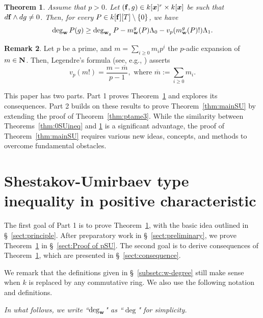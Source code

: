 \documentclass{amsart}
\theoremstyle{plain}
\newtheorem{thm}{Theorem}[section]
\theoremstyle{definition}
\newtheorem{rem}[thm]{Remark}
\newcommand{\zs}{\{ 0\} }
\newcommand{\sm}{\setminus}
\newcommand{\ol}{\overline}
\newcommand{\N}{{\bf N}}
\newcommand{\x}{{\boldsymbol x}}
\newcommand{\w}{{\bf w}}
\newcommand{\ff}{{\bf f}}
\newcommand{\kx}{k[\x]}
\newcommand{\degww  }{\mathop{\rm deg}_{\w }\nolimits}
\begin{document}
\begin{thm}\label{thm:main}
Assume that $p>0$. 
Let $(\ff ,g)\in \kx ^r\times \kx $ be such that $d\ff \wedge dg\ne 0$. 
Then, for every $P\in k[\ff ][T]\sm \zs $, we have 
\begin{equation}\label{eq:pSUineq general}
\degww  P(g)\ge 
\deg _{\w _g}P-m_{\w }^g(P)\Lambda _0-v_p(m_{\w }^g(P)!)\Lambda _1. 
\end{equation}
\end{thm}


\begin{rem}\label{rem:Legendre}\rm 
Let $p$ be a prime, 
and $m=\sum _{i\ge 0}m_ip^i$ the $p$-adic expansion of $m\in \N $. 
Then, 
Legendre's formula (see, e.g., \cite[Theorem 2.6.4]{NF}) asserts 
\begin{equation}\label{eq:Legendre}
v_p(m!)=\dfrac{m-\ol{m}}{p-1}, 
\text{ \ where \ }
\ol{m}:=\sum _{i\ge 0}m_i. 
\end{equation}
\end{rem}



This paper has two parts. 
Part 1 proves Theorem~\ref{thm:main} and explores its consequences. 
Part 2 builds on these results to prove Theorem~\ref{thm:mainSU} 
by extending the proof of Theorem~\ref{thm:ptame3}. 
While the similarity between Theorems~\ref{thm:0SUineq} and \ref{thm:main} 
is a significant advantage, 
the proof of Theorem~\ref{thm:mainSU} requires various 
new ideas, concepts, and methods 
to overcome fundamental obstacles. 



\part{Shestakov-Umirbaev type inequality in positive characteristic}


The first goal of Part 1 is to prove Theorem~\ref{thm:main}, 
with the basic idea outlined in \S~\ref{sect:principle}. 
After preparatory work in \S ~\ref{sect:preliminary}, 
we prove Theorem~\ref{thm:main} in \S ~\ref{sect:Proof of pSU}. 
The second goal is to derive consequences of Theorem~\ref{thm:main}, 
which are presented in \S ~\ref{sect:consequence}. 



We remark that the definitions given in 
\S~\ref{subsetc:w-degree} 
still make sense when $k$ 
is replaced by any commutative ring. 
We also use the following notation and definitions. 
\begin{center}\it
In what follows, we write ``$\degww  $" as ``$\deg $" for simplicity. 
\end{center}
\end{document}
